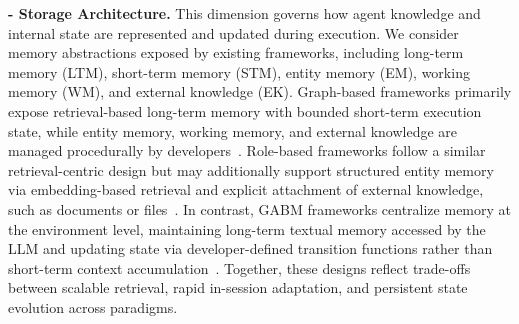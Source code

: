 \noindent\textbf{- Storage Architecture.}
This dimension governs how agent knowledge and internal state are represented and updated during execution. We consider memory abstractions exposed by existing frameworks, including long-term memory (LTM), short-term memory (STM), entity memory (EM), working memory (WM), and external knowledge (EK). Graph-based frameworks primarily expose retrieval-based long-term memory with bounded short-term execution state, while entity memory, working memory, and external knowledge are managed procedurally by developers~\cite{langgraph2025}. Role-based frameworks follow a similar retrieval-centric design but may additionally support structured entity memory via embedding-based retrieval and explicit attachment of external knowledge, such as documents or files~\cite{crewai2025,wu2024autogen,openaiagents2025}. 
%
In contrast, GABM frameworks centralize memory at the environment level, maintaining long-term textual memory accessed by the LLM and updating state via developer-defined transition functions rather than short-term context accumulation~\cite{vezhnevets2023generative}. Together, these designs reflect trade-offs between scalable retrieval, rapid in-session adaptation, and persistent state evolution across paradigms.\shorten

